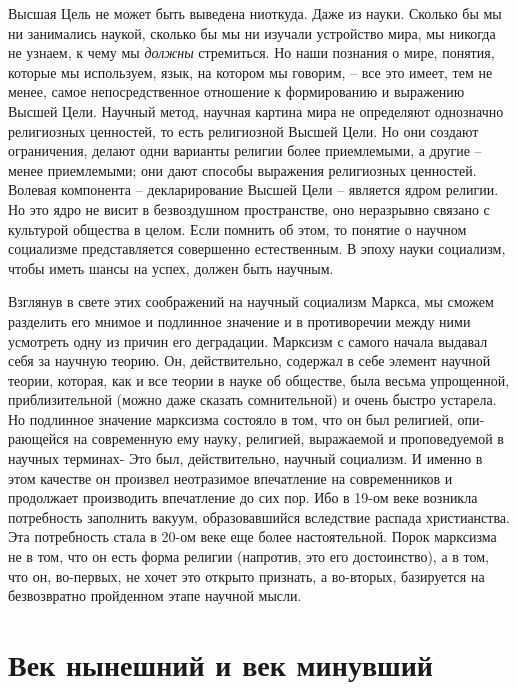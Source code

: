 \documentclass{book}
\begin{document}
Высшая Цель не может быть выведена ниоткуда. Даже из науки. Сколько бы мы ни занимались наукой, сколько бы мы ни изучали устройство мира, мы никогда не узнаем, к чему мы \textit{должны}  стремиться. Но наши познания о мире, понятия, которые мы используем, язык, на котором мы говорим, -- все это имеет, тем не менее, самое непосредственное отношение к формированию и выражению Высшей Цели. Научный метод, научная картина мира не определяют однозначно религиозных ценностей, то есть религиозной Высшей Цели. Но они создают ограничения, делают одни варианты религии более приемлемыми, а другие -- менее приемлемыми; они дают способы выражения религиозных ценностей. Волевая компонента -- декларирование Высшей Цели -- является ядром религии. Но это ядро не висит в безвоздушном пространстве, оно неразрывно связано с культурой общества в целом. Если помнить об этом, то понятие о научном социализме представляется совершенно естественным. В эпоху науки социализм, чтобы иметь шансы на успех, должен быть научным.

Взглянув в свете этих соображений на научный социализм Маркса, мы сможем разделить его мнимое и подлинное значение и в противоречии между ними усмотреть одну из причин его деградации. Марксизм с самого начала выдавал себя за научную теорию. Он, действительно, содержал в себе элемент научной теории, которая, как и все теории в науке об обществе, была весьма упрощенной, приблизительной (можно даже сказать сомнительной) и очень быстро устарела. Но подлинное значение марксизма состояло в том, что он был религией, опи­рающейся на современную ему науку, религией, выражаемой и проповедуемой в научных терминах- Это был, действительно, научный социализм. И именно в этом качестве он произвел не­отразимое впечатление на современников и продолжает производить впечатление до сих пор. Ибо в 19-ом веке возникла потребность заполнить вакуум, образовавшийся вследствие распада христианства. Эта потребность стала в 20-ом веке еще более настоятельной. Порок марксизма не в том, что он есть форма религии (напротив, это его 
достоинство), а в том, что он, во-первых, не хочет это открыто признать, а во-вторых, базируется на безвозвратно пройденном этапе научной мысли.

\section{Век нынешний и век минувший}
\end{document}
